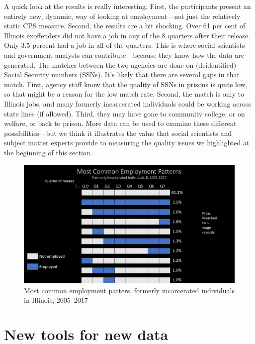 \documentclass[]{krantz}
\begin{document}
A quick look at the results is really interesting. First, the
participants present an entirely new, dynamic, way of looking at
employment---not just the relatively static CPS measure. Second, the
results are a bit shocking. Over 61 per cent of Illinois exoffenders did
not have a job in any of the 8 quarters after their release. Only 3.5
percent had a job in all of the quarters. This is where social
scientists and government analysts can contribute---because they know
how the data are generated. The matches between the two agencies are
done on (deidentified) Social Security numbers (SSNs). It's likely that
there are several gaps in that match. First, agency staff know that the
quality of SSNs in prisons is quite low, so that might be a reason for
the low match rate. Second, the match is only to Illinois jobs, and many
formerly incarcerated individuals could be working across state lines
(if allowed). Third, they may have gone to community college, or on
welfare, or back to prison. More data can be used to examine these
different possibilities---but we think it illustrates the value that
social scientists and subject matter experts provide to measuring the
quality issues we highlighted at the beginning of this section.

\begin{figure}

{\centering \includegraphics[width=0.9\linewidth]{ChapterIntro/figures/patterns} 

}

\caption{Most common employment patters, formerly incarcerated individuals in Illinois, 2005--2017}\label{fig:patternfig}
\end{figure}

\hypertarget{sec:1-5}{\section{New tools for new data}\label{sec:1-5}}
\end{document}
